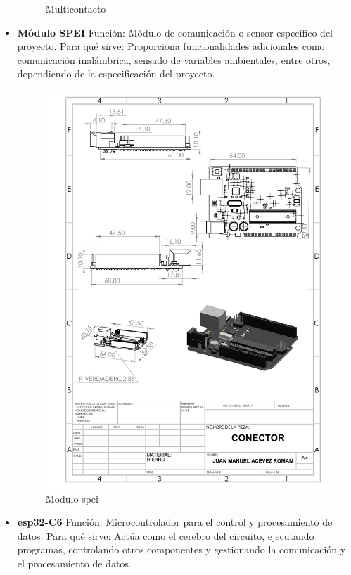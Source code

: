\begin{itemize}
\begin{figure}[H]
        \caption{Multicontacto}
    \end{figure}
    \item \textbf{Módulo SPEI}
    Función: Módulo de comunicación o sensor específico del proyecto.
    Para qué sirve: Proporciona funcionalidades adicionales como comunicación inalámbrica, sensado de variables ambientales, entre otros, dependiendo de la especificación del proyecto.
    \begin{figure}[H]
        \centering
        \includegraphics[scale=0.30]{1/img/conector.pdf}
        \caption{Modulo spei}
    \end{figure}
    \item \textbf{esp32-C6}
    Función: Microcontrolador para el control y procesamiento de datos.
    Para qué sirve: Actúa como el cerebro del circuito, ejecutando programas, controlando otros componentes y gestionando la comunicación y el procesamiento de datos.

\end{itemize}
